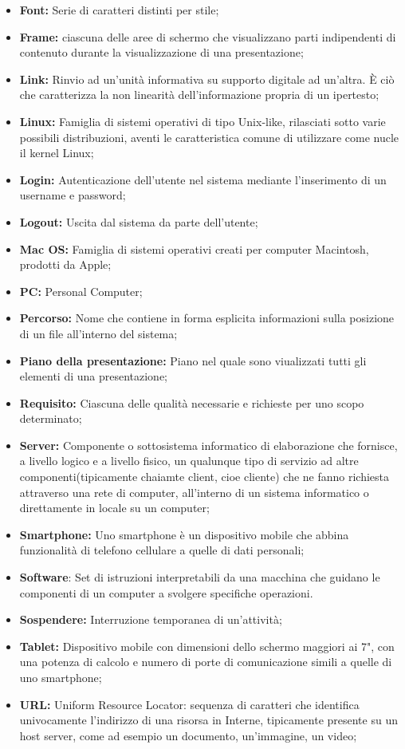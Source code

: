 \begin{itemize}
\item \textbf{Font:} Serie di caratteri distinti per stile;
\item \textbf{Frame:} ciascuna delle aree di schermo che visualizzano parti indipendenti di contenuto durante la visualizzazione di una presentazione;
\item \textbf{Link:} Rinvio ad un'unità informativa su supporto digitale ad un'altra. È ciò che caratterizza la non linearità dell'informazione propria di un ipertesto;
\item \textbf{Linux:} Famiglia di sistemi operativi di tipo Unix-like, rilasciati sotto varie possibili distribuzioni, aventi le caratteristica comune di utilizzare come nucle il kernel Linux;
\item \textbf{Login:} Autenticazione dell'utente nel sistema mediante l'inserimento di un username e password;
\item \textbf{Logout:} Uscita dal sistema da parte dell'utente;
\item \textbf{Mac OS:} Famiglia di sistemi operativi creati per computer Macintosh, prodotti da Apple;
\item \textbf{PC:} Personal Computer;
\item \textbf{Percorso:} Nome che contiene in forma esplicita informazioni sulla posizione di un file all'interno del sistema;
\item \textbf{Piano della presentazione:} Piano nel quale sono viualizzati tutti gli elementi di una presentazione;
\item \textbf{Requisito:} Ciascuna delle qualità necessarie e richieste per uno scopo determinato;
\item \textbf{Server:} Componente o sottosistema informatico di elaborazione che fornisce, a livello logico e a livello fisico, un qualunque tipo di servizio ad altre componenti(tipicamente chaiamte client, cioe cliente) che ne fanno richiesta attraverso una rete di computer, all'interno di un sistema informatico o direttamente in locale su un computer;
\item \textbf{Smartphone:} Uno smartphone è un dispositivo mobile che abbina funzionalità di telefono cellulare a quelle di dati personali;
\item \textbf{Software}: Set di istruzioni interpretabili da una macchina che guidano le componenti di un computer a svolgere specifiche operazioni.
\item \textbf{Sospendere:} Interruzione temporanea di un'attività;
\item \textbf{Tablet:} Dispositivo mobile con dimensioni dello schermo maggiori ai 7", con una potenza di calcolo e numero di porte di comunicazione simili a quelle di uno smartphone;
\item \textbf{URL:} Uniform Resource Locator: sequenza di caratteri che identifica univocamente l'indirizzo di una risorsa in Interne, tipicamente presente su un host server, come ad esempio un documento, un'immagine, un video;


\end{itemize}



